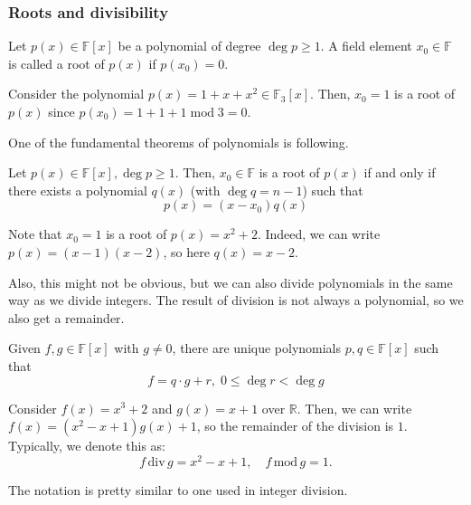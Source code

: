 \documentclass[../lecture-notes.tex]{subfiles}
\begin{document}
\subsubsection{Roots and divisibility}

\begin{definition}
    Let $p(x) \in \mathbb{F}[x]$ be a polynomial of degree $\deg p \geq 1$. A field element $x_0 \in \mathbb{F}$ is called a root of $p(x)$ if $p(x_0) = 0$.
\end{definition}

\begin{example}
    Consider the polynomial $p(x) = 1 + x + x^2 \in \mathbb{F}_3[x]$. Then, $x_0=1$ is a root of $p(x)$ since $p(x_0) = 1 + 1 + 1 \; \text{mod} \; 3 = 0$.
\end{example}

One of the fundamental theorems of polynomials is following.

\begin{theorem}
    Let $p(x) \in \mathbb{F}[x], \deg p \geq 1$. Then, $x_0 \in \mathbb{F}$ is a root of $p(x)$ if and only if there exists a polynomial $q(x)$ (with $\deg q = n-1$) such that
    \begin{equation*}
        p(x) = (x-x_0)q(x)
    \end{equation*}
\end{theorem}

\begin{example}
    Note that $x_0=1$ is a root of $p(x) = x^2+2$. Indeed, we can write $p(x) = (x-1)(x-2)$, so here $q(x) = x-2$.
\end{example}

Also, this might not be obvious, but we can also divide polynomials in the same way as we divide integers. The result of division is not always a polynomial, so we also get a remainder.

\begin{theorem}
    Given $f,g \in \mathbb{F}[x]$ with $g \neq 0$, there are unique polynomials $p,q \in \mathbb{F}[x]$ such that 
    \begin{equation*}
        f = q \cdot g + r, \; 0 \leq \deg r < \deg g
    \end{equation*}
\end{theorem}

\begin{example}
    Consider $f(x) = x^3+2$ and $g(x) = x+1$ over $\mathbb{R}$. Then, we can write $f(x) = (x^2-x+1)g(x) + 1$, so the remainder of the division is $1$. Typically, we denote this as:
    \begin{equation*}
        f \, \text{div} \, g = x^2-x+1, \quad f \, \text{mod} \, g = 1.
    \end{equation*}

    The notation is pretty similar to one used in integer division.
\end{example}
\end{document}
